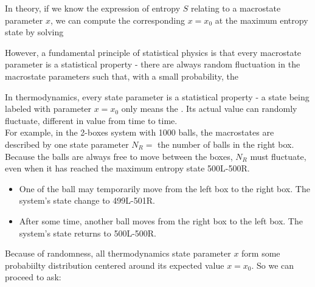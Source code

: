 \documentclass[class=article, crop=false, 12pt]{standalone}
\begin{document}
In theory, if we know the expression of entropy $S$ relating to a macrostate parameter $x$,
we can compute the corresponding $x=x_0$ at the maximum entropy state by solving

However, a fundamental principle of statistical physics is that every macrostate parameter is a statistical property - 
there are always random fluctuation in the macrostate parameters such that, 
with a small probability,
the 

In thermodynamics, every state parameter is a statistical property - 
a state being labeled with parameter $x=x_0$ only means the .
Its actual value can randomly fluctuate, 
different in value from time to time.\\

For example, in the 2-boxes system with 1000 balls, 
the macrostates are described by one state parameter $N_R=$ the number of balls in the right box. 
Because the balls are always free to move between the boxes, 
$N_R$ must fluctuate, even when it has reached the maximum entropy state 500L-500R. 
\begin{itemize}
    \item
    One of the ball may temporarily move from the left box to the right box.
    The system's state change to 499L-501R. 

    \item After some time, another ball moves from the right box to the left box.
    The system's state returns to 500L-500R.
\end{itemize}


Because of randomness, 
all thermodynamics state parameter $x$ form some probabiilty distribution centered around its expected value $x=x_0$.
So we can proceed to ask:
\begin{center}
\end{center}
\end{document}
